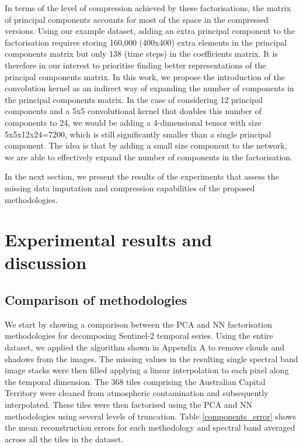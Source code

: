 \documentclass[essd, manuscript]{copernicus}
\begin{document}
In terms of the level of compression achieved by these factorisations, the matrix of principal components accounts for most of the space in the compressed versions. Using our example dataset, adding an extra principal component to the factorisation requires storing 160,000 (400x400) extra elements in the principal components matrix but only 138 (time steps) in the coefficients matrix. It is therefore in our interest to prioritise finding better representations of the principal components matrix. In this work, we propose the introduction of the convolution kernel as an indirect way of expanding the number of components in the principal components matrix. In the case of considering 12 principal components and a 5x5 convolutional kernel that doubles this number of components to 24, we would be adding a 4-dimensional tensor with size 5x5x12x24=7200, which is still significantly smaller than a single principal component. The idea is that by adding a small size component to the network, we are able to effectively expand the number of components in the factorisation.

In the next section, we present the results of the experiments that assess the missing data imputation and compression capabilities of the proposed methodologies. 


\section{Experimental results and discussion}

\subsection{Comparison of methodologies}
We start by showing a comparison between the PCA and NN factorisation methodologies for decomposing Sentinel-2 temporal series. Using the entire dataset, we applied the algorithm shown in Appendix A to remove clouds and shadows from the images. The missing values in the resulting single spectral band image stacks were then filled applying a linear interpolation to each pixel along the temporal dimension. The 368 tiles comprising the Australian Capital Territory were cleaned from atmospheric contamination and subsequently interpolated. These tiles were then factorised using the PCA and NN methodologies using several levels of truncation. Table \ref{components_error} shows the mean reconstruction errors for each methodology and spectral band averaged across all the tiles in the dataset. 
\end{document}
